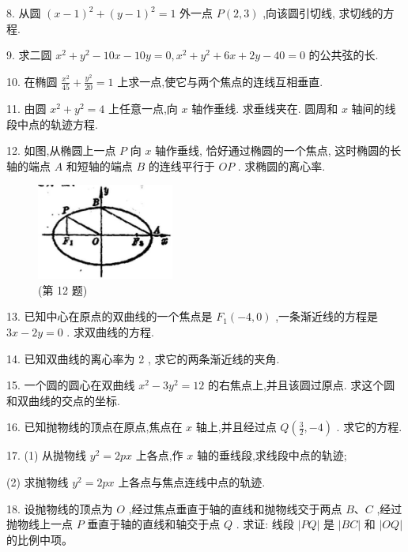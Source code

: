 \documentclass[lang=cn,newtx,10.5pt,scheme=chinese]{elegantbook}
\begin{document}
8. 从圆 \({\left( x - 1\right) }^{2} + {\left( y - 1\right) }^{2} = 1\) 外一点 \(P\left( {2,3}\right)\) ,向该圆引切线, 求切线的方程.

9. 求二圆 \({x}^{2} + {y}^{2} - {10x} - {10y} = 0,{x}^{2} + {y}^{2} + {6x} + {2y} - {40} = 0\) 的公共弦的长.

10. 在椭圆 \(\frac{{x}^{2}}{45} + \frac{{y}^{2}}{20} = 1\) 上求一点,使它与两个焦点的连线互相垂直.

11. 由圆 \({x}^{2} + {y}^{2} = 4\) 上任意一点,向 \(x\) 轴作垂线. 求垂线夹在. 圆周和 \(x\) 轴间的线段中点的轨迹方程.

12. 如图,从椭圆上一点 \(P\) 向 \(x\) 轴作垂线, 恰好通过椭圆的一个焦点, 这时椭圆的长轴的端点 \(A\) 和短轴的端点 \(B\) 的连线平行于 \({OP}\) . 求椭圆的离心率.

\begin{figure}[h]
  \centering
  \includegraphics[max width=0.4\textwidth]{images/01912cc2-ffb6-728e-9ae7-b113ff05c64b_130_291818.jpg}
  \caption{(第 12 题)}
\end{figure}



13. 已知中心在原点的双曲线的一个焦点是 \({F}_{1}\left( {-4,0}\right)\) ,一条渐近线的方程是 \({3x} - {2y} = 0\) . 求双曲线的方程.

14. 已知双曲线的离心率为 2 , 求它的两条渐近线的夹角.

15. 一个圆的圆心在双曲线 \({x}^{2} - 3{y}^{2} = {12}\) 的右焦点上,并且该圆过原点. 求这个圆和双曲线的交点的坐标.

16. 已知抛物线的顶点在原点,焦点在 \(x\) 轴上,并且经过点 \(Q\left( {\frac{3}{2}, - 4}\right)\) . 求它的方程.

17. (1) 从抛物线 \({y}^{2} = {2px}\) 上各点,作 \(x\) 轴的垂线段,求线段中点的轨迹;

(2) 求抛物线 \({y}^{2} = {2px}\) 上各点与焦点连线中点的轨迹.

18. 设抛物线的顶点为 \(O\) ,经过焦点垂直于轴的直线和抛物线交于两点 \(B\text{、}C\) ,经过抛物线上一点 \(P\) 垂直于轴的直线和轴交于点 \(Q\) . 求证: 线段 \(\left| {PQ}\right|\) 是 \(\left| {BC}\right|\) 和 \(\left| {OQ}\right|\) 的比例中项。
\end{document}

